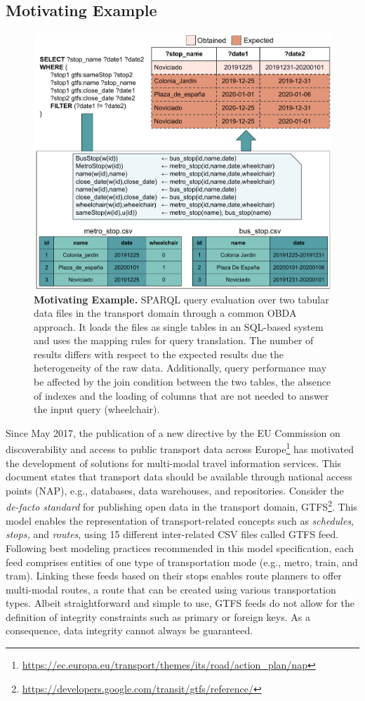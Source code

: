\subsection{Motivating Example}
\begin{figure}[ht]
    \centering
    \includegraphics[width=0.6\linewidth]{figures/example.pdf}
    \caption[Morph-CSV motivating example]{\textbf{Motivating Example.} SPARQL query evaluation over two tabular data files in the transport domain through a common OBDA approach. It loads the files as single tables in an SQL-based system and uses the mapping rules for query translation. The number of results differs with respect to the expected results due the heterogeneity of the raw data. Additionally, query performance may be affected by the join condition between the two tables, the absence of indexes and the loading of columns that are not needed to answer the input query (wheelchair).}
    \label{fig:example}
\end{figure}
Since May 2017, the publication of a new directive by the EU Commission on discoverability and access to public transport data across Europe\footnote{\url{https://ec.europa.eu/transport/themes/its/road/action_plan/nap}} has motivated the development of solutions for multi-modal travel information services. This document states that transport data should be available through national access points (NAP), e.g., databases, data warehouses, and repositories. Consider the \emph{de-facto standard} for publishing open data in the transport domain, GTFS\footnote{\url{https://developers.google.com/transit/gtfs/reference/}}. This model enables the representation of transport-related concepts such as \textit{schedules}, \textit{stops,} and \textit{routes}, using 15 different inter-related CSV files called GTFS feed. Following best modeling practices recommended in this model specification, each feed comprises entities of one type of transportation mode (e.g., metro, train, and tram). Linking these feeds based on their stops enables route planners to offer multi-modal routes, a route that can be created using various transportation types.
Albeit straightforward and simple to use, GTFS feeds do not allow for the definition of integrity constraints such as primary or foreign keys. As a consequence, data integrity cannot always be guaranteed. 

